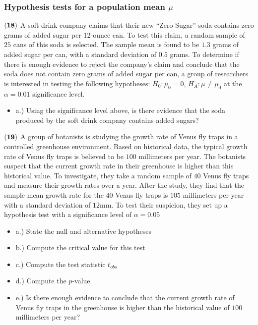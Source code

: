 \documentclass[
]{article}
\providecommand{\tightlist}{%
  \setlength{\itemsep}{0pt}\setlength{\parskip}{0pt}}
\begin{document}
\subsubsection{\texorpdfstring{Hypothesis tests for a population mean
\(\mu\)}{Hypothesis tests for a population mean \textbackslash mu}}\label{hypothesis-tests-for-a-population-mean-mu}

\(\bf (18)\) A soft drink company claims that their new ``Zero Sugar''
soda contains zero grams of added sugar per 12-ounce can. To test this
claim, a random sample of \(25\) cans of this soda is selected. The
sample mean is found to be \(1.3\) grams of added sugar per can, with a
standard deviation of \(0.5\) grams. To determine if there is enough
evidence to reject the company's claim and conclude that the soda does
not contain zero grams of added sugar per can, a group of researchers is
interested in testing the following hypotheses: \(H_0: \mu_0 = 0\),
\(H_A: \mu \neq \mu_0\) at the \(\alpha = 0.01\) significance level.

\begin{itemize}
\tightlist
\item
  a.) Using the significance level above, is there evidence that the
  soda produced by the soft drink company contains added sugars?
\end{itemize}

\(\bf (19)\) A group of botanists is studying the growth rate of Venus
fly traps in a controlled greenhouse environment. Based on historical
data, the typical growth rate of Venus fly traps is believed to be
\(100\) millimeters per year. The botanists suspect that the current
growth rate in their greenhouse is higher than this historical value. To
investigate, they take a random sample of \(40\) Venus fly traps and
measure their growth rates over a year. After the study, they find that
the sample mean growth rate for the \(40\) Venus fly traps is \(105\)
millimeters per year with a standard deviation of \(12\)mm. To test
their suspicion, they set up a hypothesis test with a significance level
of \(\alpha = 0.05\)

\begin{itemize}
\item
  a.) State the null and alternative hypotheses
\item
  b.) Compute the critical value for this test
\item
  c.) Compute the test statistic \(t_{obs}\)
\item
  d.) Compute the \(p\)-value
\item
  e.) Is there enough evidence to conclude that the current growth rate
  of Venus fly traps in the greenhouse is higher than the historical
  value of \(100\) millimeters per year?
\end{itemize}
\end{document}
